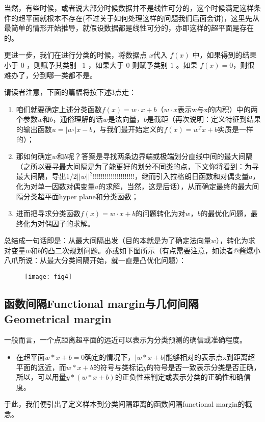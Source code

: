 \documentclass[a4paper,12pt]{article}
\begin{document}
当然，有些时候，或者说大部分时候数据并不是线性可分的，这个时候满足这样条件的超平面就根本不存在(不过关于如何处理这样的问题我们后面会讲)，这里先从最简单的情形开始推导，就假设数据都是线性可分的，亦即这样的超平面是存在的。
    
更进一步，我们在进行分类的时候，将数据点 $x$代入 $f(x)$ 中，如果得到的结果小于 $0$ ，则赋予其类别$ -1$ ，如果大于 $0$ 则赋予类别 $1$ 。如果 $f(x)=0$，则很难办了，分到哪一类都不是。

请读者注意，下面的篇幅将按下述3点走：
\begin{enumerate}
\item 咱们就要确定上述分类函数$f(x) = w\cdot x + b$（$w\cdot x$表示w与x的内积）中的两个参数$w$和$b$，通俗理解的话$w$是法向量，$b$是截距（再次说明：定义特征到结果的输出函数$u=\vert w\cdot \vert x-b$，与我们最开始定义的$f(x)=w^Tx+b$实质是一样的）；
\item 那如何确定$w$和$b$呢？答案是寻找两条边界端或极端划分直线中间的最大间隔（之所以要寻最大间隔是为了能更好的划分不同类的点，下文你将看到：为寻最大间隔，导出$1/2||w||^2!!!!!!!!!!!!!!!!!!!!!$，继而引入拉格朗日函数和对偶变量$a$，化为对单一因数对偶变量$a$的求解，当然，这是后话），从而确定最终的最大间隔分类超平面hyper plane和分类函数；
\item 进而把寻求分类函数$f(x) = w\cdot x + b$的问题转化为对$w$，$b$的最优化问题，最终化为对偶因子的求解。
\end{enumerate}

总结成一句话即是：从最大间隔出发（目的本就是为了确定法向量$w$），转化为求对变量$w$和$b$的凸二次规划问题。亦或如下图所示（有点需要注意，如读者@酱爆小八爪所说：从最大分类间隔开始，就一直是凸优化问题）：
\begin{figure}[H]
\centering
\texttt{[image: fig4]}
\end{figure}

\subsection{函数间隔Functional margin与几何间隔Geometrical margin }

一般而言，一个点距离超平面的远近可以表示为分类预测的确信或准确程度。

\begin{itemize}
\item 在超平面$w*x+b=0$确定的情况下，$|w*x+b|$能够相对的表示点x到距离超平面的远近，而$w*x+b$的符号与类标记$y$的符号是否一致表示分类是否正确，所以，可以用量$y*(w*x+b)$的正负性来判定或表示分类的正确性和确信度。
\end{itemize}
于此，我们便引出了定义样本到分类间隔距离的函数间隔functional margin的概念。
\end{document}
